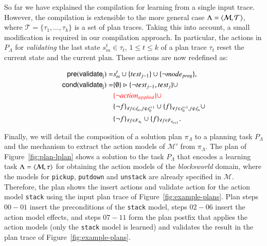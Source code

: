 So far we have explained the compilation for learning from a single input trace. However, the compilation is extensible to the more general case $\Lambda={\langle \mathcal{M},\mathcal{T} \rangle}$, where $\mathcal{T}=\{\tau_1,\ldots,\tau_k\}$ is a set of plan traces. Taking this into account, a small modification is required in our compilation approach. In particular, the actions in $P_{\Lambda}$ for {\em validating} the last state $s_m^t\in \tau_t$, {\tt\small $1\leq t\leq k$} of a plan trace $\tau_t$ reset the current state and the current plan. These actions are now redefined as:


\begin{small}
	\begin{align*}
	\hspace*{7pt}\mathsf{pre}(\mathsf{validate_{j}})=&s_m^t\cup\{test_{j-1}\}\cup \{\neg mode_{prog}\},\\
	\mathsf{cond}(\mathsf{validate_{j}})=&\{\emptyset\}\rhd\{\neg test_{j-1},test_j\} \cup \\
	&\textcolor{red}{ \{\neg action_{applied}\} \cup }
	 \\
	&\{\neg f\}_{\forall f\in s_m^t, f \notin s_0^{t+1}}\cup \{f\}_{\forall f\in s_0^{t+1}, f \notin s_m^t} \cup \\
	&\{\neg f\}_{\forall f\in F_{\pi_t}}\cup \{f\}_{\forall f\in F_{\pi_{t+1}}}.\\
	\end{align*}
\end{small}

Finally, we will detail the composition of a solution plan $\pi_\Lambda$ to a planning task $P_\Lambda$ and the mechanism to extract the action models of $\mathcal{M}'$ from $\pi_\Lambda$. The plan of Figure~\ref{fig:plan-lplan} shows a solution to the task $P_{\Lambda}$ that encodes a learning task $\Lambda={\langle \mathcal{M},\tau \rangle}$ for obtaining the action models of the {\em blocksworld} domain, where the models for {\tt\small pickup}, {\tt\small putdown} and {\tt\small unstack} are already specified in $\mathcal{M}$. Therefore, the plan shows the insert actions and validate action for the action model {\tt\small stack} using the input plan trace of Figure~\ref{fig:example-plans}. Plan steps $00-01$ insert the preconditions of the {\tt\small stack} model, steps $02-06$ insert the action model effects, and steps $07-11$ form the plan postfix that applies the action models (only the {\tt\small stack} model is learned) and validates the result in the plan trace of Figure~\ref{fig:example-plans}.

